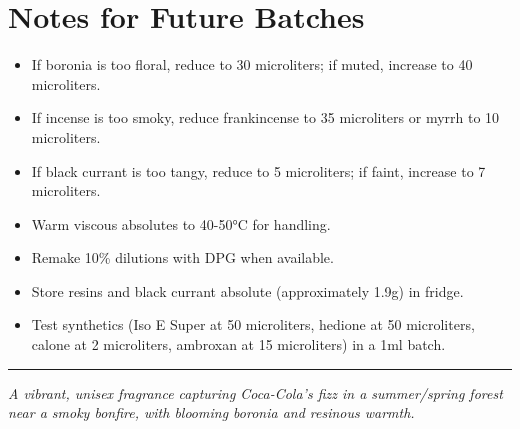 \documentclass{article}
\begin{document}
\section*{Notes for Future Batches}
\begin{itemize}
  \item If boronia is too floral, reduce to 30 microliters; if muted, increase to 40 microliters.
  \item If incense is too smoky, reduce frankincense to 35 microliters or myrrh to 10 microliters.
  \item If black currant is too tangy, reduce to 5 microliters; if faint, increase to 7 microliters.
  \item Warm viscous absolutes to 40-50°C for handling.
  \item Remake 10\% dilutions with DPG when available.
  \item Store resins and black currant absolute (approximately 1.9g) in fridge.
  \item Test synthetics (Iso E Super at 50 microliters, hedione at 50 microliters, calone at 2 microliters, ambroxan at 15 microliters) in a 1ml batch.
\end{itemize}

\vspace{1cm}
\begin{center}
\textcolor{violetPurple}{\rule{0.8\textwidth}{0.4pt}}
\end{center}

\begin{center}
\textit{\textcolor{colaDark}{A vibrant, unisex fragrance capturing Coca-Cola’s fizz in a summer/spring forest near a smoky bonfire, with blooming boronia and resinous warmth.}}
\end{center}
\end{document}
